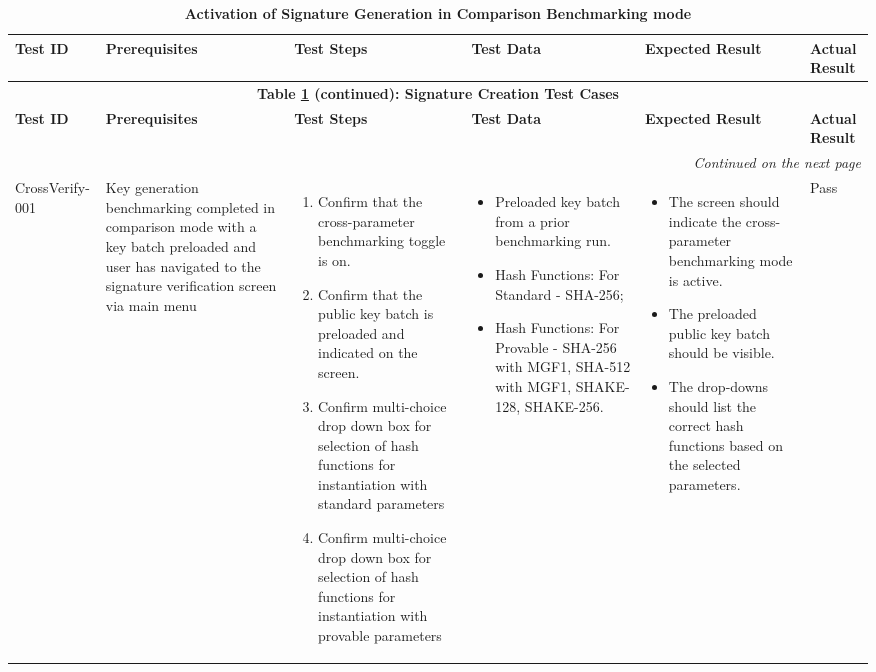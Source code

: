 \documentclass[]{final_report}
\theoremstyle{definition}
\begin{document}
\begin{longtable}{|l|p{2.5cm}|p{2.8cm}|p{3.5cm}|p{3cm}|p{1.3cm}|}
  \caption{\textbf{Activation of Signature Generation in Comparison Benchmarking mode}} 
  \label{tab:signature_creation} \\
  \hline
  \textbf{Test ID} & \textbf{Prerequisites} & \textbf{Test Steps} & \textbf{Test Data} & \textbf{Expected Result} & \textbf{Actual Result} \\
  \hline
  \endfirsthead

  \multicolumn{6}{c}{\textbf{Table \ref{tab:signature_creation} (continued): Signature Creation Test Cases}} \\
  \hline
  \textbf{Test ID} & \textbf{Prerequisites} & \textbf{Test Steps} & \textbf{Test Data} & \textbf{Expected Result} & \textbf{Actual Result} \\
  \hline
  \endhead

  \hline
  \multicolumn{6}{r}{\textit{Continued on the next page}} \\
  \endfoot

  \hline
  \endlastfoot

CrossVerify-001 & Key generation benchmarking completed in comparison mode with a key batch preloaded and user has navigated to the signature verification screen via main menu &
\begin{enumerate}
\item Confirm that the cross-parameter benchmarking toggle is on.
\item Confirm that the public key batch is preloaded and indicated on the screen.
\item Confirm multi-choice drop down box for selection of hash functions for instantiation with standard parameters
\item Confirm multi-choice drop down box for selection of hash functions for instantiation with provable parameters
\end{enumerate} &
\begin{itemize}
\item Preloaded key batch from a prior benchmarking run.
\item Hash Functions: For Standard - SHA-256; 
\item Hash Functions: For Provable - SHA-256 with MGF1, SHA-512 with MGF1, SHAKE-128, SHAKE-256.
\end{itemize} &
\begin{itemize}
\item The screen should indicate the cross-parameter benchmarking mode is active.
\item The preloaded public key batch should be visible.
\item The drop-downs should list the correct hash functions based on the selected parameters.
\end{itemize} &Pass \\
\hline
  
\end{longtable}
\end{document}
